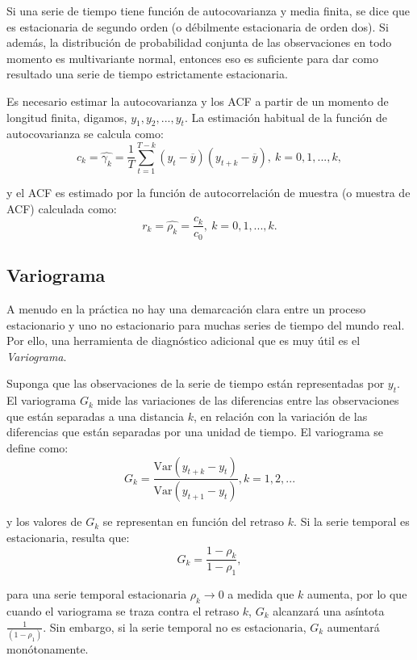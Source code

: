 Si una serie de tiempo tiene función de autocovarianza y media finita, se dice que es estacionaria de segundo orden (o débilmente estacionaria de orden dos). Si además, la distribución de probabilidad conjunta de las observaciones en todo momento es multivariante normal, entonces eso es suficiente para dar como resultado una serie de tiempo estrictamente estacionaria.

Es necesario estimar la autocovarianza y los ACF a partir de un momento de longitud finita, digamos, $y_{1}, y_{2}, ..., y_{t}$. La estimación habitual de la función de autocovarianza se calcula como:
\begin{equation}
c_{k} = \hat{\gamma_{k}} = \frac{1}{T} \sum_{t=1}^{T-k} (y_{t}-\overline{y})(y_{t+k}-\overline{y}), \ k=0, 1, ..., k,
\end{equation}

y el ACF es estimado por la función de autocorrelación de muestra (o muestra de ACF) calculada como:
\begin{equation}
r_{k} = \hat{\rho_{k}} = \frac{c_{k}}{c_{0}}, \ k=0, 1, ..., k.
\end{equation}

\subsection{Variograma}

A menudo en la práctica no hay una demarcación clara entre un proceso estacionario y uno no estacionario para muchas series de tiempo del mundo real. Por ello, una herramienta de diagnóstico adicional que es muy útil es el \textit{Variograma}.

Suponga que las observaciones de la serie de tiempo están representadas por $y_{t}$. El variograma $G_{k}$ mide las variaciones de las diferencias entre las observaciones que están separadas a una distancia $k$, en relación con la variación de las diferencias que están separadas por una unidad de tiempo. El variograma se define como:
\begin{equation}
G_{k} = \frac{\text{Var}(y_{t+k}-y_{t})}{\text{Var}(y_{t+1}-y_{t})}, k=1, 2, ...
\end{equation}

y los valores de $G_{k}$ se representan en función del retraso $k$. Si la serie temporal es estacionaria, resulta que:
\begin{equation}
G_{k} = \frac{1- \rho_{k}}{1-\rho_{1}},
\end{equation}

para una serie temporal estacionaria $\rho_{k} \rightarrow 0$ a medida que $k$ aumenta, por lo que cuando el variograma se traza contra el retraso $k$, $G_{k}$ alcanzará una asíntota $\frac{1}{(1 - \rho_{1})}$. Sin embargo, si la serie temporal no es estacionaria, $G_{k}$ aumentará monótonamente. 



